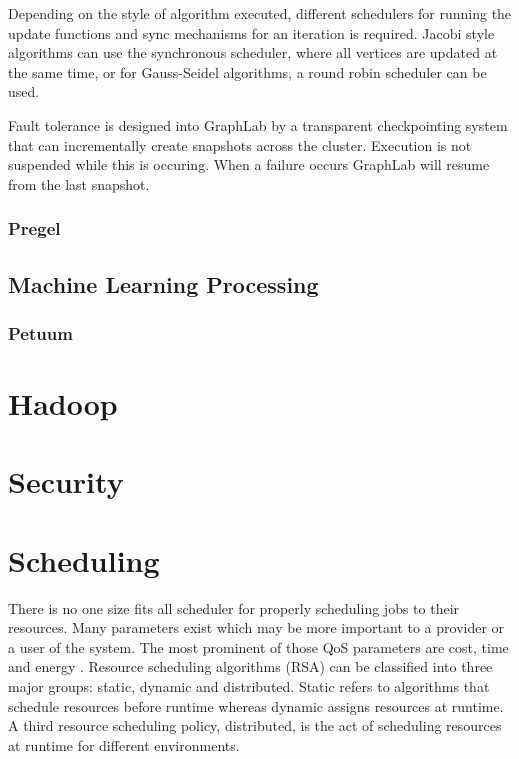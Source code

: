 \documentclass[12pt]{article}
\begin{document}
Depending on the style of algorithm executed, different schedulers for running the update functions and sync mechanisms for an iteration is required. Jacobi style algorithms can use the synchronous scheduler, where all vertices are updated at the same time, or for Gauss-Seidel algorithms, a round robin scheduler can be used.

Fault tolerance is designed into GraphLab by a transparent checkpointing system that can incrementally create snapshots across the cluster. Execution is not suspended while this is occuring. When a failure occurs GraphLab will resume from the last snapshot.



\subsubsection{Pregel}




\subsection{Machine Learning Processing}

\cite{zhang2016survey,xing2015petuum}

\subsubsection{Petuum}




\section{Hadoop} \label{sec:hadoop}

\cite{zhang2016survey,polato2014hadoop,sakr2013hadoop}

\section{Security} \label{sec:security}

\cite{liu2015survey,kazim2015survey,kalpana2015brief}



\section{Scheduling} \label{sec:scheduling}

There is no one size fits all scheduler for properly scheduling jobs to their resources. Many parameters exist which may be more important to a provider or a user of the system. The most prominent of those QoS parameters are cost, time and energy \cite{Singh2016}. Resource scheduling algorithms (RSA) can be classified into three major groups: static, dynamic and distributed. Static refers to algorithms that schedule resources before runtime whereas dynamic assigns resources at runtime. A third resource scheduling policy, distributed, is the act of scheduling resources at runtime for different environments.
\end{document}
